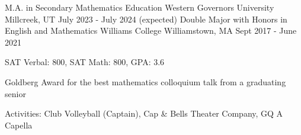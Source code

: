 \begin{cventries}
  \cventry
    {M.A. in Secondary Mathematics Education}
    {Western Governors University}
    {Millcreek, UT}
    {July 2023 - July 2024 (expected)}
    {}
  \cventry
    {Double Major with Honors in English and Mathematics}
    {Williams College}
    {Williamstown, MA}
    {Sept 2017 - June 2021}
    {
    \begin{cvitems}
      \item {SAT Verbal: 800, SAT Math: 800, GPA: 3.6}
      \item {Goldberg Award for the best mathematics colloquium talk from a graduating senior}
      \item {Activities: Club Volleyball (Captain), Cap \& Bells Theater Company, GQ A Capella}
    \end{cvitems}
    }
\end{cventries}
